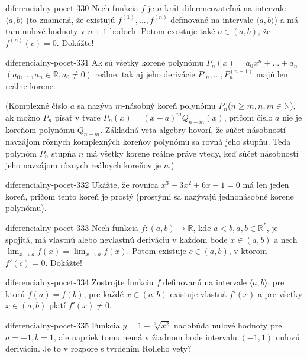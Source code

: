 \begin{defproblem}{diferencialny-pocet-330}
Nech funkcia $f$ je $n$-krát diferencovateľná na intervale $\langle a,b \rangle$ (to znamená, že existujú $f^{(1)},...,f^{(n)}$ definované na intervale $\langle a,b \rangle$) a má tam nulové hodnoty v $n+1$ bodoch. Potom exostuje také $o\in (a,b)$, že $f^{(n)}(c)=0$. Dokážte!
\end{defproblem}

\begin{defproblem}{diferencialny-pocet-331}
Ak sú všetky korene polynómu $P_n(x)=a_0x^n+...+a_n$ $(a_0,...,a_n\in\mathbb{R},a_0\neq 0)$ reálne, tak aj jeho derivácie $P'_n,...,P_n^{(n-1)}$ majú len reálne korene.

(Komplexné číslo $a$ sa nazýva $m$-násobný koreň polynómu $P_n$($n\geq m,n,m\in\mathbb{N}$), ak možno $P_n$ písať v tvare $P_n(x)=(x-a)^mQ_{n-m}(x)$, pričom číslo $a$ nie je koreňom polynómu $Q_{n-m}$. Základná veta algebry hovorí, že súčet násobností navzájom rôznych komplexných koreňov polynómu sa rovná jeho stupňu. Teda polynóm $P_n$ stupňa $n$ má všetky korene reálne práve vtedy, keď súčet násobností jeho navzájom rôznych reálnych koreňov je $n$.)
\end{defproblem}

\begin{defproblem}{diferencialny-pocet-332}
Ukážte, že rovnica $x^3-3x^2+6x-1=0$ má len jeden koreň, pričom tento koreň je prostý (prostými sa nazývajú jednonásobné korene polynómu).
\end{defproblem}

\begin{defproblem}{diferencialny-pocet-333}
Nech funkcia $f:(a,b)\rightarrow\mathbb{R}$, kde $a<b,a,b\in\mathbb{R^*}$, je spojitá, má vlastnú alebo nevlastnú deriváciu v každom bode $x\in (a,b)$ a nech $\lim_{x\rightarrow a}f(x)=\lim_{x\rightarrow a}f(x)$. Potom existuje $c\in (a,b)$, v ktorom $f'(c)=0$. Dokážte!
\end{defproblem}

\begin{defproblem}{diferencialny-pocet-334}
Zostrojte funkciu $f$ definovanú na intervale $\langle a,b \rangle$, pre ktorú $f(a)=f(b)$, pre každé $x\in (a,b)$ existuje vlastná $f'(x)$ a pre všetky $x\in (a,b)$ platí $f'(x)\neq 0$.
\end{defproblem}

\begin{defproblem}{diferencialny-pocet-335}
Funkcia $y=1-\sqrt[3]{x^2}$ nadobúda nulové hodnoty pre $a=-1,b=1$, ale napriek tomu nemá v žiadnom bode intervalu $(-1,1)$ nulovú deriváciu. Je to v rozpore s tvrdením Rolleho vety?
\end{defproblem}

